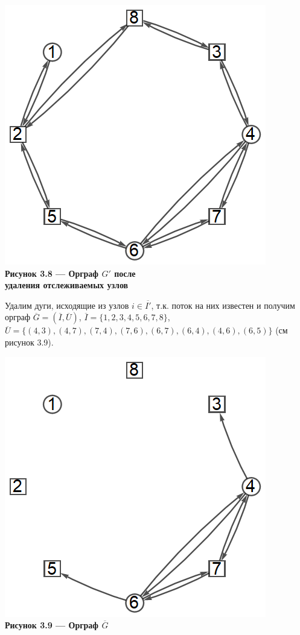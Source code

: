 \documentclass[14pt]{extarticle}%
\begin{document}
\begin{center}
\includegraphics[scale=0.6]{grs/s3g1.png}\\
\textbf{Рисунок 3.8 --- Орграф $G'$ после \\удаления отслеживаемых узлов}
\end{center}

Удалим дуги, исходящие из узлов $i\in \overline{I'}$, т.к. поток на них известен и получим орграф $\overline{G}=(\overline{I},\overline{U})$, $\overline{I}=\{1,2,3,4,5,6,7,8\}$,\\ $\overline{U}=\{(4, 3), (4, 7), (7, 4), (7, 6), (6, 7), (6, 4), (4, 6), (6, 5)\}$ (см рисунок 3.9).

\begin{center}
\includegraphics[scale=0.6]{grs/s3overg.png}\\
\textbf{Рисунок 3.9 --- Орграф $\overline{G}$}
\end{center}
\end{document}
